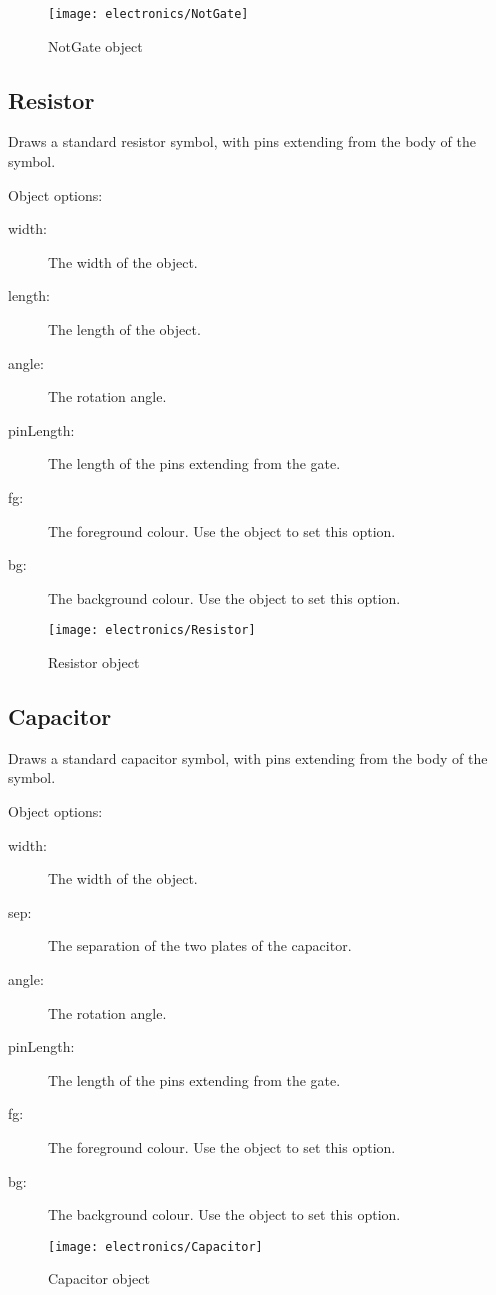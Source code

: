 \begin{figure}[h]
\centerline{\texttt{[image: electronics/NotGate]}}
\caption{NotGate object}
\label{fig:not_gate}
\end{figure}

\subsection{Resistor}
Draws a standard resistor symbol, with pins extending from the body of the
symbol.

Object options:
\begin{description}
\item[width:] The width of the object.
\item[length:] The length of the object.
\item[angle:] The rotation angle.
\item[pinLength:] The length of the pins extending from the gate.
\item[fg:] The foreground colour.  Use the  object to set this
option.
\item[bg:] The background colour.  Use the  object to set this
option.
\end{description}

\begin{figure}[h]
\centerline{\texttt{[image: electronics/Resistor]}}
\caption{Resistor object}
\label{fig:resistor}
\end{figure}

\subsection{Capacitor}
Draws a standard capacitor symbol, with pins extending from the body of the
symbol.

Object options:
\begin{description}
\item[width:] The width of the object.
\item[sep:] The separation of the two plates of the capacitor.
\item[angle:] The rotation angle.
\item[pinLength:] The length of the pins extending from the gate.
\item[fg:] The foreground colour.  Use the  object to set this
option.
\item[bg:] The background colour.  Use the  object to set this
option.
\end{description}

\begin{figure}[h]
\centerline{\texttt{[image: electronics/Capacitor]}}
\caption{Capacitor object}
\label{fig:capacitor}
\end{figure}

